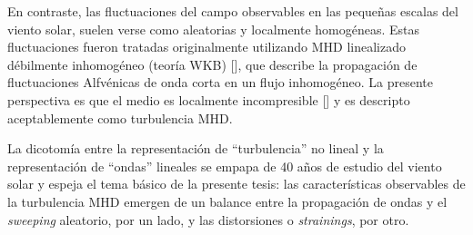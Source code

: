 En contraste, las fluctuaciones del campo observables en las pequeñas
escalas del viento solar, suelen verse como aleatorias y localmente
homogéneas. Estas fluctuaciones fueron tratadas originalmente
utilizando MHD linealizado débilmente inhomogéneo (teoría WKB)
[\cite{parker_dynamical_1965, hollweg_alfven_1973,
  hollweg_transverse_1974, hollweg_transition_1986,
  jacques_momentum_1977, matthaeus_transport_1994}], que describe la
propagación de fluctuaciones Alfv\'enicas de onda corta en un flujo
inhomogéneo. La presente perspectiva es que el medio es localmente
incompresible [\cite{matthaeus_evidence_1990}] y es descripto
aceptablemente como turbulencia MHD.

La dicotomía entre la representación de ``turbulencia'' no lineal y la
representación de ``ondas'' lineales se empapa de 40 años de estudio
del viento solar y espeja el tema básico de la presente tesis: las
características observables de la turbulencia MHD emergen de un
balance entre la propagación de ondas y el \textit{sweeping}
aleatorio, por un lado, y las distorsiones o \textit{strainings}, por
otro.


